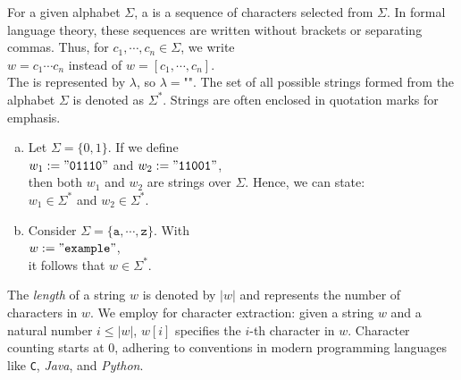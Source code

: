 \begin{Definition}[Strings]
For a given alphabet \( \Sigma \), a   is a sequence of characters selected from \( \Sigma \). In formal language theory, these sequences are written without brackets or separating commas. Thus, for \( c_1, \cdots, c_n \in \Sigma \), we write
\\[0.2cm]
\hspace*{1.3cm}
\( w = c_1 \cdots c_n \) \quad instead of \quad \( w = [c_1, \cdots, c_n] \).
\\[0.2cm]
The  is represented by \( \lambda \), \index{\( \lambda \)} so \( \lambda = \texttt{""} \).
The set of all possible strings formed from the alphabet \( \Sigma \) is denoted as \( \Sigma^* \). \index{\( \Sigma^* \)} Strings are often enclosed in quotation marks for emphasis.
\eox
\end{Definition}
\pagebreak

\examplesEng
\begin{enumerate}[(a)]
\item Let \( \Sigma = \{0, 1\} \).  If we define
      \\[0.2cm]
      \hspace*{1.3cm}
      \( w_1 := \mathtt{"01110"} \) and \( w_2 := \mathtt{"11001"} \),
      \\[0.2cm]
      then both \( w_1 \) and \( w_2 \) are strings over \( \Sigma \). Hence, we can state:
      \\[0.2cm]
      \hspace*{1.3cm}
      \( w_1 \in \Sigma^* \) and \( w_2 \in \Sigma^* \).
\item Consider \( \Sigma = \{\mathtt{a}, \cdots, \mathtt{z}\} \). With
      \\[0.2cm]
      \hspace*{1.3cm}
      \( w := \mathtt{"example"} \),
      \\[0.2cm]
      it follows that \( w \in \Sigma^* \). \eox
\end{enumerate}

The \emph{length} of a string \( w \) is denoted by \( |w| \) and represents the number of characters in \( w
\).  
We employ  for character extraction: given a string \( w \) and a natural number
\( i \leq |w| \), \( w[i] \) specifies the \( i \)-th character in \( w \). Character counting starts at 0, adhering to
conventions in modern programming languages like \texttt{C}, \textsl{Java}, and \textsl{Python}. 


